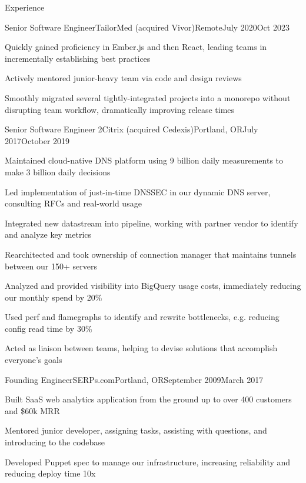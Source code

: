 \documentclass[letterpaper,10pt]{article}
\begin{document}
\begin{rsection}{Experience}
\begin{rexperienceitem}{Senior Software Engineer}{TailorMed (acquired Vivor)}{Remote}{July 2020}{Oct 2023}
  \item Quickly gained proficiency in Ember.js and then React, leading teams in incrementally establishing best practices
  \item Actively mentored junior-heavy team via code and design reviews
  \item Smoothly migrated several tightly-integrated projects into a monorepo without disrupting team workflow, dramatically improving release times
\end{rexperienceitem}
  \begin{rexperienceitem}{Senior Software Engineer 2}{Citrix (acquired Cedexis)}{Portland, OR}{July 2017}{October 2019}
  \item Maintained cloud-native DNS platform using 9 billion daily measurements to make 3 billion daily decisions
  \item Led implementation of just-in-time DNSSEC in our dynamic DNS server, consulting RFCs and real-world usage
  \item Integrated new datastream into pipeline, working with partner vendor to identify and analyze key metrics
  \item Rearchitected and took ownership of connection manager that maintains tunnels between our 150+ servers
  \item Analyzed and provided visibility into BigQuery usage costs, immediately reducing our monthly spend by 20\%
  \item Used perf and flamegraphs to identify and rewrite bottlenecks, e.g. reducing config read time by 30\%
  \item Acted as liaison between teams, helping to devise solutions that accomplish everyone's goals
\end{rexperienceitem}
\begin{rexperienceitem}{Founding Engineer}{SERPs.com}{Portland, OR}{September 2009}{March 2017}
  \item Built SaaS web analytics application from the ground up to over 400 customers and \$60k MRR
  \item Mentored junior developer, assigning tasks, assisting with questions, and introducing to the codebase
  \item Developed Puppet spec to manage our infrastructure, increasing reliability and reducing deploy time 10x

\end{rexperienceitem}
\end{rsection}
\end{document}
